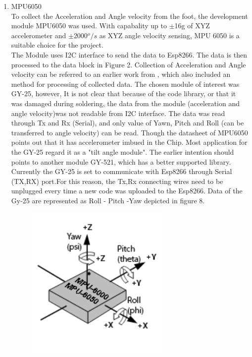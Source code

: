 \documentclass[12pt,a4paper]{article}
\begin{document}
\begin{enumerate}
  \item MPU6050\\
To collect the Acceleration and Angle velocity from the foot, the development module MPU6050 was used. With capabality up to $\pm$16g of XYZ accelerometer and $\pm$2000$^o/s$ as XYZ angle velocity sensing, MPU 6050 is a suitable choice for the project.\\
The Module uses I2C interface to send the data to Esp8266. The data is then processed to the data block in Figure 2. Collection of Acceleration and Angle velocity can be referred to an earlier work from \cite{acc1}, which also included an method for processing of collected data. The chosen module of interest was GY-25, however, It is not clear that because of the code library, or that it was damaged during soldering, the data from the module (acceleration and angle velocity)was not readable from I2C interface. The data was read through Tx and Rx (Serial)\cite{GY25}, and only value of Yawn, Pitch and Roll (can be transferred to angle velocity) can be read. Though the datasheet of MPU6050 points out that it has accelerometer imbued in the Chip\cite{MPU6050}. Most application for the GY-25 regard it as a "tilt angle module". The earlier intention should points to another module GY-521, which has a better supported library.\\
Currently the GY-25 is set to communicate with Esp8266 through Serial (TX,RX) port.For this reason, the Tx,Rx connecting wires need to be unplugged every time a new code was uploaded to the Esp8266. Data of the Gy-25 are represented as Roll - Pitch -Yaw depicted in figure 8.
\begin{figure}
\begin{center}
\includegraphics[width = 70mm]{rpy.png}
\hfill

\end{center}
\end{figure}
\end{enumerate}
\end{document}
